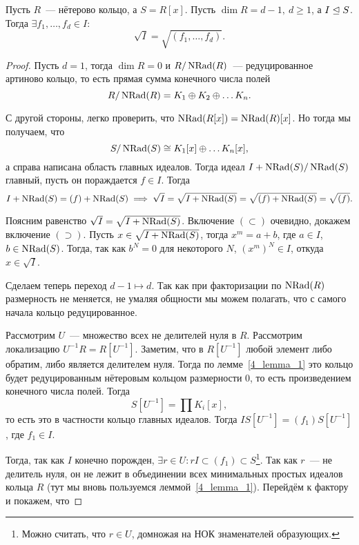  	\hypertarget{bilet_12}{}

 	\begin{theorem} 
 		Пусть $R$~--- нётерово кольцо, а $S = R[x]$. Пусть $\dim{R} = d - 1, \ d \ge 1$, а $I \trianglelefteq S$. Тогда $\exists f_1, \ldots, f_{d} \in I\colon$
 		\[
 			\sqrt{I} = \sqrt{(f_1, \ldots, f_d)}.
 		\]
 	\end{theorem}
 	\begin{proof}
 		Пусть $d = 1$, тогда $\dim{R} = 0$ и $R/\operatorname{NRad}(R)$~--- редуцированное артиново кольцо, то есть прямая сумма конечного числа полей 
 		\[
 			R/\operatorname{NRad}(R) = K_1 \oplus K_2 \oplus \ldots K_n.
 		\]

 		С другой стороны, легко проверить, что $\operatorname{NRad}(R[x]) = \operatorname{NRad}(R)[x]$. Но тогда мы получаем, что 
 		\[
 			S/\operatorname{NRad}(S) \cong K_1[x] \oplus \ldots K_n[x],
 		\]
 		а справа написана область главных идеалов. Тогда идеал $I + \operatorname{NRad}(S)/\operatorname{NRad}(S)$ главный, пусть он пораждается $f \in I$. Тогда 
 		\[
 			I + \operatorname{NRad}(S) = (f) + \operatorname{NRad}(S) \implies \sqrt{I} = \sqrt{I + \operatorname{NRad}(S)} = \sqrt{(f) + \operatorname{NRad}(S)} = \sqrt{(f)}. 
  		\]

  		Поясним равенство $\sqrt{I} = \sqrt{I + \operatorname{NRad}(S)}$. Включение $(\subset)$ очевидно, докажем включение $(\supset)$. Пусть $x \in \sqrt{I + \operatorname{NRad}(S)}$, тогда $x^m = a + b$, где $a \in I$, $b \in \operatorname{NRad}(S)$. Тогда, так как $b^N = 0$ для некоторого $N$, $(x^m)^N \in I$, откуда $x \in \sqrt{I}$. 
  		

  		Сделаем теперь переход $d - 1 \mapsto d$. Так как при факторизации по $\operatorname{NRad}(R)$ размерность не меняется, не умаляя общности мы можем полагать, что с самого начала кольцо редуцированное. 

  		Рассмотрим $U$~--- множество всех не делителей нуля в $R$. Рассмотрим локализацию $U^{-1}R = R[U^{-1}]$. Заметим, что в $R[U^{-1}]$ любой элемент либо обратим, либо является делителем нуля.  Тогда по лемме~\ref{4_lemma_1} это кольцо будет редуцированным нётеровым кольцом размерности 0, то есть произведением конечного числа полей. Тогда 
  		\[
  			S[U^{-1}] = \prod K_i[x],
  		\]
  		то есть это в частности кольцо главных идеалов. Тогда  $IS[U^{-1}] = (f_1) S[U^{-1}]$, где $f_1 \in I$.

  		 Тогда, так как $I$ конечно порожден, $\exists r \in U\colon r I \subset (f_1) \subset S$\footnote{Можно считать, что $r \in U$, домножая на НОК знаменателей образующих. }. Так как $r$~--- не делитель нуля, он не лежит в объединении всех минимальных простых идеалов кольца $R$ (тут мы вновь пользуемся леммой~\ref{4_lemma_1}). Перейдём к фактору и покажем, что


\end{proof}
